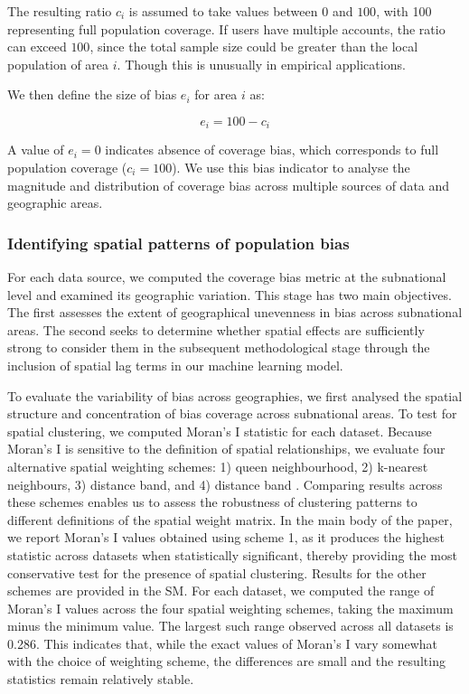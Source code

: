 \documentclass[]{rsos}%
\begin{document}
The resulting ratio \(c_i\) is assumed to take values
between \(0\) and \(100\), with 100 representing full population coverage.
If users have multiple accounts, the ratio can exceed \(100\), since the
total sample size could be greater than the local population of area
\(i\). Though this is unusually in empirical applications.

We then define the size of bias \(e_i\) for area \(i\) as:

\begin{equation} \label{eq:size-bias}
e_i = 100 - c_i
\end{equation}

A value of \(e_i = 0\) indicates absence of coverage bias, which
corresponds to full population coverage (\(c_i = 100\)). We use this bias
indicator to analyse the magnitude and distribution of coverage bias
across multiple sources of data and geographic areas.

\subsubsection{Identifying spatial patterns of population bias}\label{identifying-spatial-patterns-of-population-bias}

For each data source, we computed the coverage bias metric at the
subnational level and examined its geographic variation. This stage has
two main objectives. The first assesses the extent of geographical unevenness in bias
across subnational areas. The second seeks to determine whether spatial effects are
sufficiently strong to consider them in the subsequent methodological
stage through the inclusion of spatial lag terms in our
machine learning model.

To evaluate the variability of bias across geographies, we first
analysed the spatial structure and concentration of bias coverage across subnational areas. To test for spatial clustering, we computed Moran's I statistic
for each dataset. Because Moran's I is sensitive to the definition of
spatial relationships, we evaluate four alternative spatial weighting
schemes: 1) queen neighbourhood, 2) k-nearest neighbours, 3) distance
band, and 4) distance band \citep{rey2023}.
Comparing results across these schemes enables us to assess the
robustness of clustering patterns to different definitions of the
spatial weight matrix. In the main body of the paper, we report Moran's
I values obtained using scheme 1, as it produces the highest statistic
across datasets when statistically significant, thereby providing the
most conservative test for the presence of spatial clustering. Results
for the other schemes are provided in the SM.
For each dataset, we computed the range of Moran's I values across the four
spatial weighting schemes, taking the maximum minus the minimum value. The largest such
range observed across all datasets is 0.286. This indicates that, while
the exact values of Moran's I vary somewhat with the choice of weighting
scheme, the differences are small and the resulting statistics remain
relatively stable.
\end{document}
